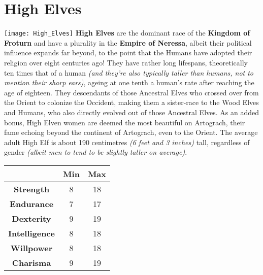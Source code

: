 \documentclass[openany,10pt,a4paper]{book}
\begin{document}
\section{High Elves}
\texttt{[image: High\_Elves]}\newline
\textbf{High Elves} are the dominant race of the \textbf{Kingdom of Froturn} and have a plurality in the \textbf{Empire of Neressa}, albeit their political influence expands far beyond, to the point that the Humans have adopted their religion over eight centuries ago! They have rather long lifespans, theoretically ten times that of a human \textit{(and they're also typically taller than humans, not to mention their sharp ears)}, ageing at one tenth a human's rate after reaching the age of eighteen. They descendants of those Ancestral Elves who crossed over from the Orient to colonize the Occident, making them a sister-race to the Wood Elves and Humans, who also directly evolved out of those Ancestral Elves. As an added bonus, High Elven women are deemed the most beautiful on Artograch, their fame echoing beyond the continent of Artograch, even to the Orient. The average adult High Elf is about 190 centimetres \textit{(6 feet and 3 inches)} tall, regardless of gender \textit{(albeit men to tend to be slightly taller on average)}.\newline
\begin{tabular}{|c|c|c|}
\hline
 & \textbf{Min} & \textbf{Max} \\ \hline
\textbf{Strength} & 8 & 18 \\ \hline
\textbf{Endurance} & 7 & 17 \\ \hline
\textbf{Dexterity} & 9 & 19 \\ \hline
\textbf{Intelligence} & 8 & 18 \\ \hline
\textbf{Willpower} & 8 & 18 \\ \hline
\textbf{Charisma} & 9 & 19 \\ \hline
\end{tabular}\newline
{} \newpage
\end{document}
